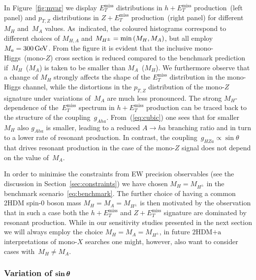 \documentclass[a4paper, 11pt,notoc]{article}
\newcommand{\MET}{\ensuremath{E_T^\mathrm{miss}}\xspace}
\newcommand{\mA}{\ensuremath{M_{A}}\xspace}
\newcommand{\mH}{\ensuremath{M_{H}}\xspace}
\newcommand{\mHc}{\ensuremath{M_{H^{\pm}}}\xspace}
\newcommand{\hdma}{\ensuremath{\textrm{2HDM+a}}\xspace}
\def\bm#1{\mbox{\boldmath$#1$\unboldmath}}
\begin{document}
In Figure~\ref{fig:mvar} we display $\MET$ distributions in $h + \MET$ production~(left panel) and $p_{T,Z}$ distributions in $Z+\MET$ production~(right panel) for different~$\mH$ and~$\mA$ values. As~indicated, the coloured histograms correspond to  different choices of $M_{H,A}$ and $\mHc = {\rm min} \left ( \mH, \mA \right )$, but all employ $M_a = 300 \, {\rm GeV}$. From the figure it is evident that the inclusive mono-Higgs~(mono-$Z$) cross section is reduced compared to the benchmark prediction if~$\mH$~($\mA$) is taken to be smaller than $\mA$~($\mH$).  We furthermore observe that  a change of $\mH$ strongly affects the shape of the $\MET$ distribution in the mono-Higgs channel, while the distortions in the $p_{T,Z}$ distribution of the mono-$Z$ signature under variations of~$\mA$ are much less pronounced. The strong $M_H$-dependence of the~$\MET$ spectrum in $h + \MET$ production can be traced back to the structure of the coupling~$g_{Aha}$. From~(\ref{eq:cubic}) one sees that for smaller~$M_H$ also $g_{Aha}$ is smaller, leading to a reduced $A \to ha$ branching ratio  and in turn to a lower rate of resonant production.  In contrast, the coupling~$g_{HZa} \propto \sin \theta$ that drives resonant production in the case of the mono-$Z$ signal does not depend on the value of~$M_A$.

In order to minimise the constraints from EW precision observables (see the discussion in Section~\ref{sec:constraints}) we have chosen $\mH = \mHc$ in the  benchmark scenario~\eqref{eq:benchmark}. The further choice of having a common 2HDM  spin-0 boson  mass $\mH = \mA = \mHc$ is then motivated by the observation that in such a case  both the $h + \MET$ and $Z + \MET$ signature are dominated by resonant production. While in our sensitivity studies presented in the next section we will always employ the choice $\mH = \mA = \mHc$, in future \hdma  interpretations of mono-$X$ searches one might, however,  also want to consider cases with~$\mH \neq \mA$. 

\subsubsection[Variation of $\sin \theta$]{Variation of $\bm{\sin \theta}$}
\end{document}
